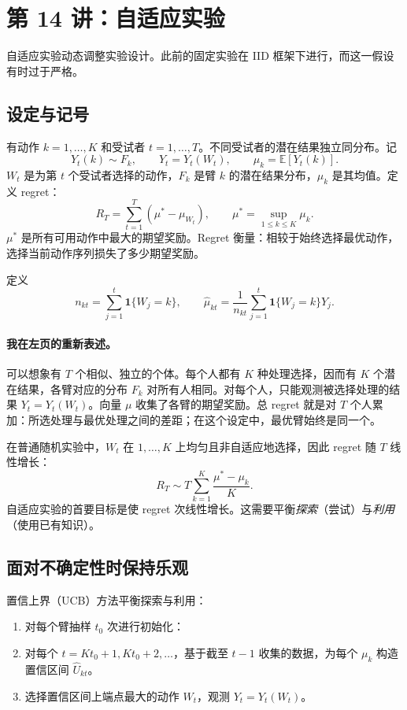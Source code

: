 \section{第 14 讲：自适应实验}
自适应实验动态调整实验设计。此前的固定实验在 IID 框架下进行，而这一假设有时过于严格。

\subsection{设定与记号}
有动作 $k=1,\ldots,K$ 和受试者 $t=1,\ldots,T$。不同受试者的潜在结果独立同分布。记
\[
 Y_t(k)\sim F_k,\qquad Y_t=Y_t(W_t),\qquad
 \mu_k=\mathbb E[Y_t(k)].
\]
$W_t$ 是为第 $t$ 个受试者选择的动作，$F_k$ 是臂 $k$ 的潜在结果分布，$\mu_k$ 是其均值。定义 regret：
\[
 R_T=\sum_{t=1}^T(\mu^*-\mu_{W_t}),\qquad
 \mu^*=\sup_{1\le k\le K}\mu_k.
\]
$\mu^*$ 是所有可用动作中最大的期望奖励。Regret 衡量：相较于始终选择最优动作，选择当前动作序列损失了多少期望奖励。

定义
\[
 n_{kt}=\sum_{j=1}^t\mathbf1\{W_j=k\},\qquad
 \widehat\mu_{kt}=\frac1{n_{kt}}\sum_{j=1}^t\mathbf1\{W_j=k\}Y_j.
\]

\paragraph{我在左页的重新表述。}
可以想象有 $T$ 个相似、独立的个体。每个人都有 $K$ 种处理选择，因而有 $K$ 个潜在结果，各臂对应的分布 $F_k$ 对所有人相同。对每个人，只能观测被选择处理的结果 $Y_t=Y_t(W_t)$。向量 $\mu$ 收集了各臂的期望奖励。总 regret 就是对 $T$ 个人累加：所选处理与最优处理之间的差距；在这个设定中，最优臂始终是同一个。

在普通随机实验中，$W_t$ 在 $1,\ldots,K$ 上均匀且非自适应地选择，因此 regret 随 $T$ 线性增长：
\[
 R_T\sim T\sum_{k=1}^K\frac{\mu^*-\mu_k}{K}.
\]
自适应实验的首要目标是使 regret 次线性增长。这需要平衡\emph{探索}（尝试）与\emph{利用}（使用已有知识）。

\subsection{面对不确定性时保持乐观}
置信上界（UCB）方法平衡探索与利用：
\begin{enumerate}
 \item 对每个臂抽样 $t_0$ 次进行初始化：
 \item 对每个 $t=Kt_0+1,Kt_0+2,\ldots$，基于截至 $t-1$ 收集的数据，为每个 $\mu_k$ 构造置信区间 $\widehat U_{kt}$。
 \item 选择置信区间上端点最大的动作 $W_t$，观测 $Y_t=Y_t(W_t)$。
\end{enumerate}

